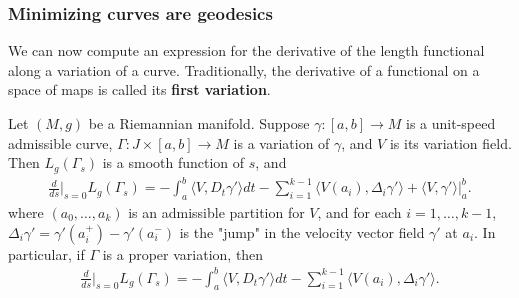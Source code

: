 \subsubsection{Minimizing curves are geodesics}
We can now compute an expression for the derivative of the length functional along a variation of a curve. Traditionally, the derivative of a functional on a space of 
maps is called its \textbf{first variation}.
\begin{theorem}\label{Riemann geodesic first variation}
Let $(M,g)$ be a Riemannian manifold. Suppose $\gamma:[a,b]\to M$ is a unit-speed admissible curve, $\Gamma:J\times[a,b]\to M$ is a variation of $\gamma$, and $V$ is its 
variation field. Then $L_g(\Gamma_s)$ is a smooth function of $s$, and
\begin{align}\label{geodesic first variation-1}
\frac{d}{ds}\Big|_{s=0}L_g(\Gamma_s)=-\int_{a}^{b}\langle V,D_t\gamma'\rangle dt-\sum_{i=1}^{k-1}\langle V(a_i),\Delta_i\gamma'\rangle+\langle V,\gamma'\rangle\Big|_{a}^{b}.
\end{align}
where $(a_0,\dots,a_k)$ is an admissible partition for $V$, and for each $i=1,\dots,k-1$, $\Delta_i\gamma'=\gamma'(a_i^+)-\gamma'(a_i^-)$ is the "jump" in the velocity vector 
field $\gamma'$ at $a_i$. In particular, if $\Gamma$ is a proper variation, then
\begin{align}\label{geodesic first variation-2}
\frac{d}{ds}\Big|_{s=0}L_g(\Gamma_s)=-\int_{a}^{b}\langle V,D_t\gamma'\rangle dt-\sum_{i=1}^{k-1}\langle V(a_i),\Delta_i\gamma'\rangle.
\end{align}
\end{theorem}
